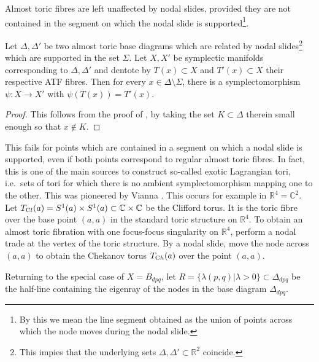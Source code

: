 \documentclass[12pt,a4paper,draft]{scrartcl}
\begin{document}
Almost toric fibres are left unaffected by nodal slides, provided they are not contained in the segment on which the nodal slide is supported\footnote{By this we mean the line segment obtained as the union of points across which the node moves during the nodal slide.}.

\begin{lemma}
    \label{thm:nodal_slide}
    Let $\Delta, \Delta'$ be two almost toric base diagrams which are related by nodal slides\footnote{This impies that the underlying sets $\Delta, \Delta' \subset \mathbb{R}^2$ coincide.} which are supported in the set $\Sigma$. Let $X,X'$ be symplectic manifolds corresponding to $\Delta,\Delta'$ and dentote by $T(x) \subset X$ and $T'(x) \subset X$ their respective ATF fibres. Then for every $x \in \Delta \setminus \Sigma$, there is a symplectomorphism $\psi \colon X \rightarrow X'$ with $\psi(T(x)) = T'(x)$.
\end{lemma}

\begin{proof}
    This follows from the proof of \cite[Theorem 8.10]{evans2021atfs}, by taking the set $K \subset \Delta$ therein small enough so that $x \notin K$.
\end{proof}

\begin{remark}
    This fails for points which are contained in a segment on which a nodal slide is supported, even if both points correspond to regular almost toric fibres. In fact, this is one of the main sources to construct so-called exotic Lagrangian tori, i.e.\ sets of tori for which there is no ambient symplectomorphism mapping one to the other. This was pioneered by Vianna \cite{Via16,Via17}. This occurs for example in $\mathbb{R}^4 = \mathbb{C}^2$. Let $T_{\text Cl}(a) = S^1(a) \times S^1(a) \subset \mathbb{C} \times \mathbb{C}$ be the Clifford torus. It is the toric fibre over the base point $(a,a)$ in the standard toric structure on $\mathbb{R}^4$. To obtain an almost toric fibration with one focus-focus singularity on $\mathbb{R}^4$, perform a nodal trade at the vertex of the toric structure. By a nodal slide, move the node across $(a,a)$ to obtain the Chekanov torus $T_{\text Ch}(a)$ over the point $(a,a)$.
\end{remark}

Returning to the special case of $X = B_{dpq}$, let $R = \{\lambda(p,q) \vert \lambda > 0\} \subset \Delta_{dpq}$ be the half-line containing the eigenray of the nodes in the base diagram $\Delta_{dpq}$. 
\end{document}
